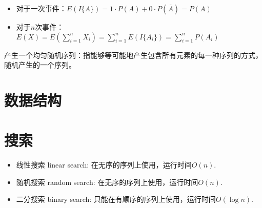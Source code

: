 \begin{itemize}
    \item 对于一次事件：$E(I\{A\}) = 1 \cdot P(A) + 0 \cdot P(\overline A) = P(A)$
    \item 对于$n$次事件：$E(X) = E(\displaystyle \sum _{i=1}^n X_i) = \sum _{i=1}^n E(I\{A_i\}) = \sum _{i=1}^n P(A_i)$
\end{itemize}

产生一个均匀随机序列：指能够等可能地产生包含所有元素的每一种序列的方式，随机产生的一个序列。

\section{数据结构}

\section{搜索}
\begin{itemize}
    \item 线性搜索 linear search: 在无序的序列上使用，运行时间$O (n)$.
    \item 随机搜索 random search: 在无序的序列上使用，运行时间$O (n)$.
    \item 二分搜索 binary search: 只能在有顺序的序列上使用，运行时间$O (\log n)$.
\end{itemize}

